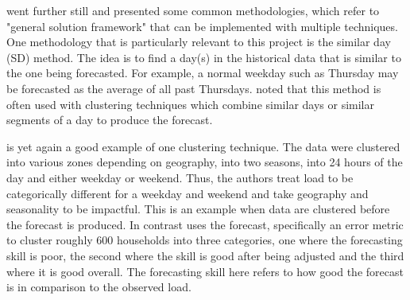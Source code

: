 \documentclass[a4paper]{article}
\begin{document}
\citet{hong16} went further still and presented some common methodologies, which refer to "general solution framework" that can be implemented with multiple techniques. One methodology that is particularly relevant to this project is the similar day (SD) method. The idea is to find a day(s) in the historical data that is similar to the one being forecasted. For example, a normal weekday such as Thursday may be forecasted as the average of all past Thursdays. \citet{hong16} noted that this method is often used with clustering techniques which combine similar days or similar segments of a day to produce the forecast.

\citet{char14} is yet again a good example of one clustering technique. The data were clustered into various zones depending on geography, into two seasons, into 24 hours of the day and either weekday or weekend. Thus, the authors treat load to be categorically different for a weekday and weekend and take geography and seasonality to be impactful. This is an example when data are clustered before the forecast is produced. In contrast \cite{dan14} uses the forecast, specifically an error metric to cluster roughly 600 households into three categories, one where the forecasting skill is poor, the second where the skill is good after being adjusted and the third where it is good overall. The forecasting skill here refers to how good the forecast is in comparison to the observed load.

\end{document}
